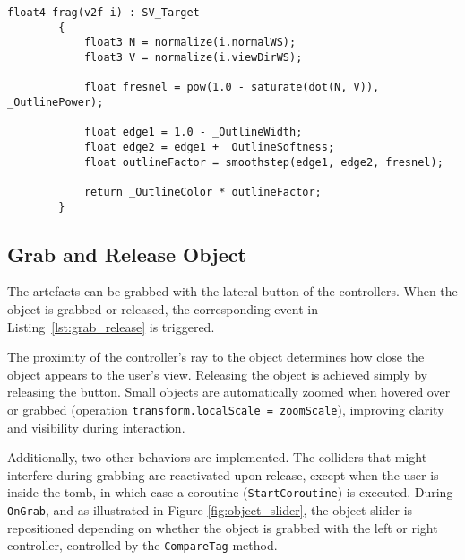 \begin{lstlisting}[language=HLSL, caption={Partial Fragment shader for creating an outline effect to the object.}, label={lst:outline_effect}]
        float4 frag(v2f i) : SV_Target
        {
            float3 N = normalize(i.normalWS);
            float3 V = normalize(i.viewDirWS);

            float fresnel = pow(1.0 - saturate(dot(N, V)), _OutlinePower);

            float edge1 = 1.0 - _OutlineWidth;
            float edge2 = edge1 + _OutlineSoftness;
            float outlineFactor = smoothstep(edge1, edge2, fresnel);

            return _OutlineColor * outlineFactor;
        }
\end{lstlisting}

\subsection*{Grab and Release Object}
\label{sec:object_interaction}

The artefacts can be grabbed with the lateral button of the controllers.
When the object is grabbed or released, the corresponding event in Listing~\ref{lst:grab_release} is triggered.  

The proximity of the controller's ray to the object determines how close the object appears to the user's view. 
Releasing the object is achieved simply by releasing the button.  
Small objects are automatically zoomed when hovered over or grabbed (operation \texttt{transform.localScale = zoomScale}), improving clarity and visibility during interaction.

Additionally, two other behaviors are implemented. 
The colliders that might interfere during grabbing are reactivated upon release, except when the user is inside the tomb, in which case a coroutine (\texttt{StartCoroutine}) is executed.
During \texttt{OnGrab}, and as illustrated in Figure \ref{fig:object_slider}, the object slider is repositioned depending on whether the object is grabbed with the left or right controller, controlled by the \texttt{CompareTag} method.


